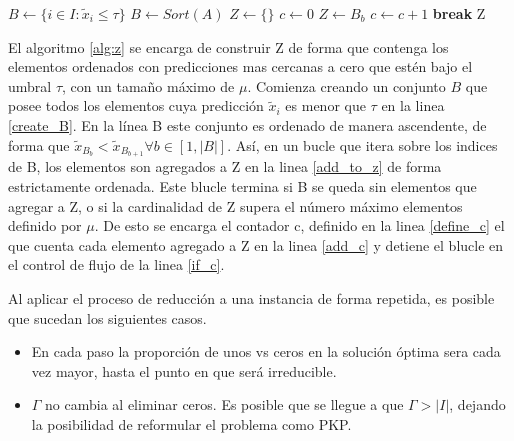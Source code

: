 \documentclass[spanish, a4paper, 12pt, openany,final]{book}
\begin{document}
 \begin{algorithm}[H]
 	\caption{$Z(\tilde{x},\tau)$}\label{alg:z}
 	\begin{algorithmic}[1]
 		\State $B \gets \{ i \in I: \tilde{x}_i \leq \tau \}$ \label{create_B}
 		\State $B \gets Sort(A)$  
 		\State $Z \gets \{\}$	  
 		\State $c \gets 0$	\label{define_c}
 				  
 		\State $Z \gets B_b$ \label{add_to_z}
 		\State $c \gets c + 1$ \label{add_c}
 		\label{if_c}
 		\State \textbf{break} \label{break}
 		\EndIf
 		\EndFor
 		\State Z
 	\end{algorithmic}
 \end{algorithm}
 
 El algoritmo \ref{alg:z} se encarga de construir Z de forma que contenga los elementos ordenados con predicciones mas cercanas a cero que estén bajo el umbral $\tau$, con un tamaño máximo de $\mu$. Comienza creando un conjunto $B$ que posee todos los elementos cuya predicción $\tilde{x}_i$ es menor que $\tau$ en la linea \ref{create_B}. En la línea B este conjunto es ordenado de manera ascendente, de forma que $\tilde{x}_{B_b} < \tilde{x}_{B_{b+1}}   \forall b \in [1,|B|]$. Así, en un bucle que itera sobre los indices de B, los elementos son agregados a Z en la linea \ref{add_to_z} de forma estrictamente ordenada. Este blucle termina si B se queda sin elementos que agregar a Z, o si la cardinalidad de Z supera el número máximo elementos definido por $\mu$. De esto se encarga el contador c, definido en la linea \ref{define_c} el que cuenta cada elemento agregado a Z en la linea \ref{add_c} y detiene el blucle en el control de flujo de la linea \ref{if_c}.
 
 
 Al aplicar el proceso de reducción a una instancia de forma repetida, es posible que sucedan los siguientes casos.
 
  \begin{itemize}
 	\item En cada paso la proporción de unos vs ceros en la solución óptima sera cada vez mayor, hasta el punto en que será irreducible.
 	
 	\item  $\Gamma$ no cambia al eliminar ceros. Es posible que se llegue a que $\Gamma > |I|$, dejando la posibilidad de reformular el problema como PKP.
 \end{itemize}
 
 
 
\end{document}
